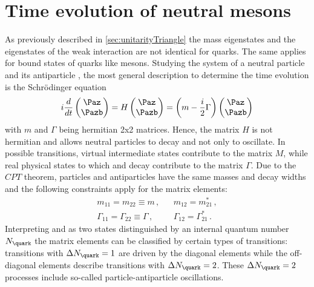 \newpage

\section[head={Time evolution of neutral mesons},tocentry={Time evolution of neutral mesons}]{Time evolution of neutral mesons}
\label{sec:TimeEvolution}

As previously described in \cref{sec:unitarityTriangle} the mass eigenstates and the eigenstates of the weak interaction are not identical for quarks.
The same applies for bound states of quarks like \B mesons.
Studying the system of a neutral particle \Paz and its antiparticle \Pazb, the most general description to determine the time evolution is the Schrödinger equation
\begin{equation}
i\frac{d}{dt}\begin{pmatrix} \Paz \\ \Pazb \end{pmatrix} = H \begin{pmatrix} \Paz \\ \Pazb \end{pmatrix}
=\left(m-\frac{i}{2}\Gamma\right)\begin{pmatrix} \Paz \\ \Pazb \end{pmatrix} \label{eq:mixMatrix}
\end{equation}
with $m$ and $\Gamma$ being hermitian 2x2 matrices.
Hence, the matrix $H$ is not hermitian and allows neutral particles \Paz to decay and not only to oscillate.
In possible transitions, virtual intermediate states contribute to the matrix $M$, while real physical states to which \Paz and \Pazb decay contribute to the matrix $\Gamma$.
Due to the $CPT$ theorem, particles and antiparticles have the same masses and decay widths and the following constraints apply for the matrix elements:
\begin{equation}
\begin{aligned}
&m_{11}=m_{22}\equiv m\,,&&m_{12}=m_{21}^\ast\,,&\\
&\Gamma_{11}=\Gamma_{22}\equiv\Gamma\,,&&\Gamma_{12}=\Gamma_{21}^\ast\,.&
\end{aligned}
\end{equation}
Interpreting \Paz and \Pazb as two states distinguished by an internal quantum number $N_\quark$ the matrix elements can be classified by certain types of transitions:
transitions with $\Delta N_\quark=1$ are driven by the diagonal elements while the off-diagonal elements describe transitions with $\Delta N_\quark=2$.
These $\Delta N_\quark=2$ processes include so-called particle-antiparticle oscillations.

